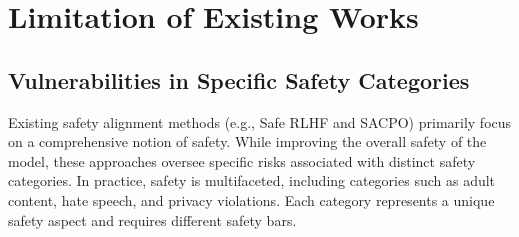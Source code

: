 \section{Limitation of Existing Works}
\subsection{Vulnerabilities in Specific Safety Categories}
\label{sec:vulnerabilities}


Existing safety alignment methods (e.g., Safe RLHF and SACPO) primarily focus on a comprehensive notion of safety. While improving the overall safety of the model, these approaches oversee specific risks associated with distinct safety categories. In practice, safety is multifaceted, including categories such as adult content, hate speech, and privacy violations. Each category represents a unique safety aspect and requires different safety bars.

